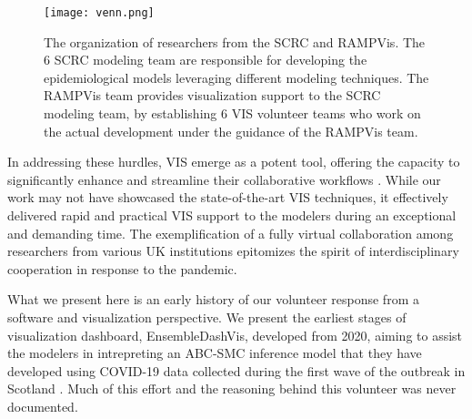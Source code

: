 \begin{figure}[tb!]
    \centering
    \texttt{[image: venn.png]}
    \caption{The organization of researchers from the SCRC and RAMPVis. The 6 SCRC modeling team are responsible for developing the epidemiological models leveraging different modeling techniques. The RAMPVis team provides visualization support to the SCRC modeling team, by establishing 6 VIS volunteer teams who work on the actual development under the guidance of the RAMPVis team.
    }
    \label{fig:venn}

\end{figure}

In addressing these hurdles, \ac{VIS} emerge as a potent tool, offering the capacity to significantly enhance and streamline their collaborative workflows \cite{swallow2022Challenges}.
While our work may not have showcased the state-of-the-art VIS techniques, it effectively delivered rapid and practical VIS support to the modelers during an exceptional and demanding time.
The exemplification of a fully virtual collaboration among researchers from various UK institutions epitomizes the spirit of interdisciplinary cooperation in response to the pandemic.

What we present here is an early history of our volunteer response from a software and visualization perspective. We present the earliest stages of visualization dashboard, EnsembleDashVis, developed from 2020, aiming to assist the modelers in intrepreting an \ac{ABC-SMC} inference model that they have developed using COVID-19 data collected during the first wave of the outbreak in Scotland \cite{2020Covid19}. Much of this effort and the reasoning behind this volunteer was never documented.
